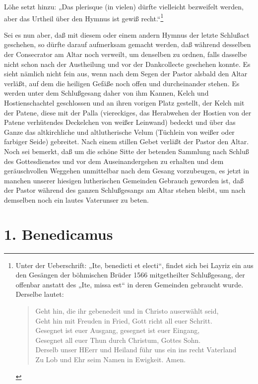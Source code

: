 Löhe setzt hinzu: „Das plerisque (in vielen) dürfte vielleicht bezweifelt werden, aber das Urtheil über den Hymnus ist gewiß recht.“\footnote{Unter der Ueberschrift: „Ite, benedicti et electi“, findet sich bei Layriz ein aus den Gesängen der böhmischen Brüder 1566 mitgetheilter Schlußgesang, der offenbar anstatt des „Ite, missa est“ in deren Gemeinden gebraucht wurde. Derselbe lautet:
\begin{verse}
Geht hin, die ihr gebenedeit und in Christo auserwählt seid,\\
Geht hin mit Freuden in Fried, Gott richt all euer Schritt.\\
Gesegnet ist euer Ausgang, gesegnet ist euer Eingang,\\
Gesegnet all euer Thun durch Christum, Gottes Sohn.\\
Derselb unser HEerr und Heiland führ uns ein ins recht Vaterland\\
Zu Lob und Ehr seim Namen in Ewigkeit. Amen.
\end{verse}
}

Sei es nun aber, daß mit diesem oder einem andern Hymnus der letzte Schlußact geschehen, so dürfte darauf aufmerksam gemacht werden, daß während desselben der Consecrator am Altar noch verweilt, um denselben zu ordnen, falls dasselbe nicht schon nach der Austheilung und vor der Dankcollecte geschehen konnte. Es sieht nämlich nicht fein aus, wenn nach dem Segen der Pastor alsbald den Altar verläßt, auf dem die heiligen Gefäße noch offen und durcheinander stehen. Es werden unter dem Schlußgesang daher von ihm Kannen, Kelch und Hostienschachtel geschlossen und an ihren vorigen Platz gestellt, der Kelch mit der Patene, diese mit der Palla (viereckiges, das Herabwehen der Hostien von der Patene verhütendes Deckelchen von weißer Leinwand) bedeckt und über das Ganze das altkirchliche und altlutherische Velum (Tüchlein von weißer oder farbiger Seide) gebreitet. Nach einem stillen Gebet verläßt der Pastor den Altar. Noch sei bemerkt, daß um die schöne Sitte der betenden Sammlung nach Schluß des Gottesdienstes und vor dem Auseinandergehen zu erhalten und dem geräuschvollen Weggehen unmittelbar nach dem Gesang vorzubeugen, es jetzt in manchen unserer hiesigen lutherischen Gemeinden Gebrauch geworden ist, daß der Pastor während des ganzen Schlußgesangs am Altar stehen bleibt, um nach demselben noch ein lautes Vaterunser zu beten.

\section{1. Benedicamus}

